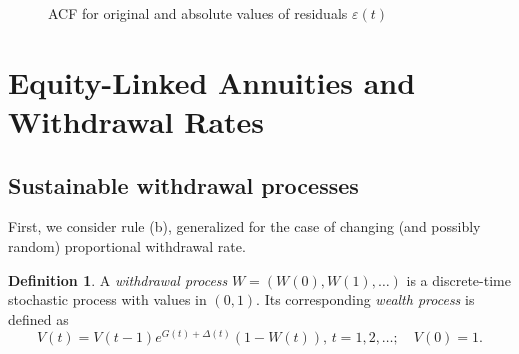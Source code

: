 \documentclass[12pt]{amsart}
\theoremstyle{definition}
\newtheorem{definition}{Definition}
\begin{document}
\begin{figure}[t]
\caption{ACF for original and absolute values of residuals $\varepsilon(t)$}
\label{fig:acf-bubble}
\end{figure}

\section{Equity-Linked Annuities and Withdrawal Rates} 



\subsection{Sustainable withdrawal processes} First, we consider rule (b), generalized for the case of changing (and possibly random) proportional withdrawal rate. 

\begin{definition} A {\it withdrawal process} $W = (W(0), W(1), \ldots)$ is a discrete-time stochastic process with values in $(0, 1)$. Its corresponding  {\it wealth process} is defined as
$$
V(t) = V(t-1)e^{G(t)+\Delta(t)}(1 - W(t)),\, t = 1, 2, \ldots;\quad V(0) = 1.
$$
\end{definition}
\end{document}
